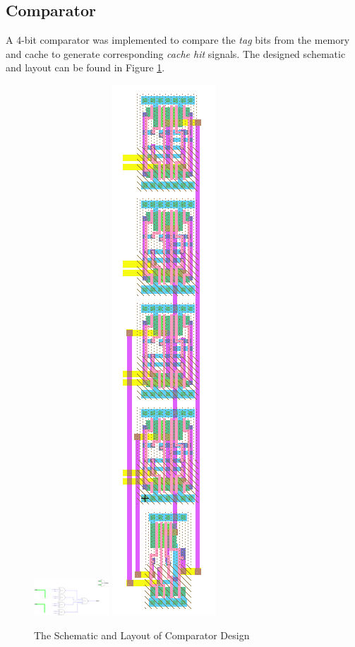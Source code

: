 \documentclass[conference]{IEEEtran}
\begin{document}
\subsection{Comparator}\label{subsec:comparator}
A 4-bit comparator was implemented to compare the \textit{tag} bits from the memory and cache to generate corresponding \textit{cache hit} signals. The designed schematic and layout can be found in Figure \ref{fig:comparator}.
\begin{figure}[h!]
  \centering
    \includegraphics[width=0.25\textwidth]{comparator_sch} \includegraphics[scale=0.25]{comparator_layout}
  \caption{The Schematic and Layout of Comparator Design}
  \label{fig:comparator}
\end{figure}
\end{document}

